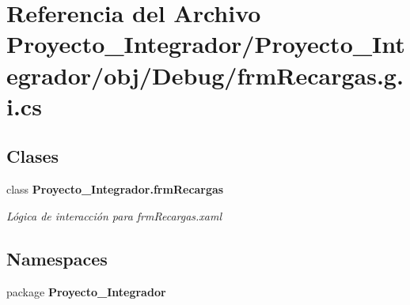 \section{Referencia del Archivo Proyecto\-\_\-\-Integrador/\-Proyecto\-\_\-\-Integrador/obj/\-Debug/frm\-Recargas.g.\-i.\-cs}
\label{frm_recargas_8g_8i_8cs}
\subsection*{Clases}
\begin{DoxyCompactItemize}
\item 
class {\bf Proyecto\-\_\-\-Integrador.\-frm\-Recargas}
\begin{DoxyCompactList}\small\item\em Lógica de interacción para frm\-Recargas.\-xaml \end{DoxyCompactList}\end{DoxyCompactItemize}
\subsection*{Namespaces}
\begin{DoxyCompactItemize}
\item 
package {\bf Proyecto\-\_\-\-Integrador}
\end{DoxyCompactItemize}
